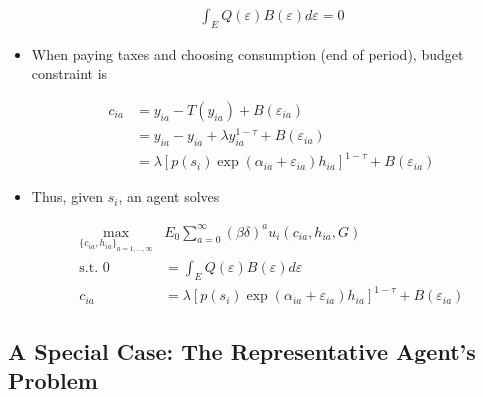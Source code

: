 \documentclass{article}
\begin{document}
\begin{itemize}
\begin{align}
\int_E Q(\varepsilon) B(\varepsilon) d\varepsilon = 0
\end{align}

\item When paying taxes and choosing consumption (end of period), budget constraint is

\begin{align}
c_{ia} 
&= y_{ia} - T(y_{ia})  + B(\varepsilon_{ia})\nonumber \\
&= y_{ia} - y_{ia} + \lambda y_{ia}^{1-\tau}  + B(\varepsilon_{ia})\nonumber \\
&= \lambda [p(s_i) \exp(\alpha_{ia} + \varepsilon_{ia}) h_{ia}]^{1-\tau} + B(\varepsilon_{ia})
\end{align}

\item Thus, given $s_i$, an agent solves

\begin{align*}
\max_{\{c_{ia}, h_{ia}\}_{a = 1, ..., \infty}} &
 E_0 \sum_{a = 0}^\infty (\beta \delta)^a u_i(c_{ia}, h_{ia}, G)\\
\text{s.t. }
0 &= \int_E Q(\varepsilon) B(\varepsilon) d\varepsilon \\
c_{ia} &= \lambda [p(s_i) \exp(\alpha_{ia} + \varepsilon_{ia}) h_{ia}]^{1-\tau} + B(\varepsilon_{ia})
\end{align*}

\end{itemize}

\subsection{A Special Case: The Representative Agent's Problem}
\end{document}
